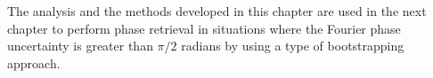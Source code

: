 The analysis and the methods developed in this chapter are used in the
next chapter to perform phase retrieval in situations where the
Fourier phase uncertainty is greater than $\pi/2$ radians by using
a type of bootstrapping approach.





